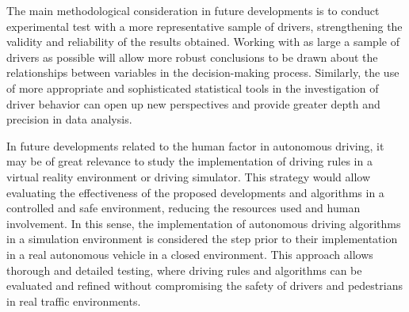 The main methodological consideration in future developments is to conduct experimental test with a more representative sample of drivers, strengthening the validity and reliability of the results obtained. Working with as large a sample of drivers as possible will allow more robust conclusions to be drawn about the relationships between variables in the decision-making process. Similarly, the use of more appropriate and sophisticated statistical tools in the investigation of driver behavior can open up new perspectives and provide greater depth and precision in data analysis.  

In future developments related to the human factor in autonomous driving, it may be of great relevance to study the implementation of driving rules in a virtual reality environment or driving simulator. This strategy would allow evaluating the effectiveness of the proposed developments and algorithms in a controlled and safe environment, reducing the resources used and human involvement. In this sense, the implementation of autonomous driving algorithms in a simulation environment is considered the step prior to their implementation in a real autonomous vehicle in a closed environment. This approach allows thorough and detailed testing, where driving rules and algorithms can be evaluated and refined without compromising the safety of drivers and pedestrians in real traffic environments.